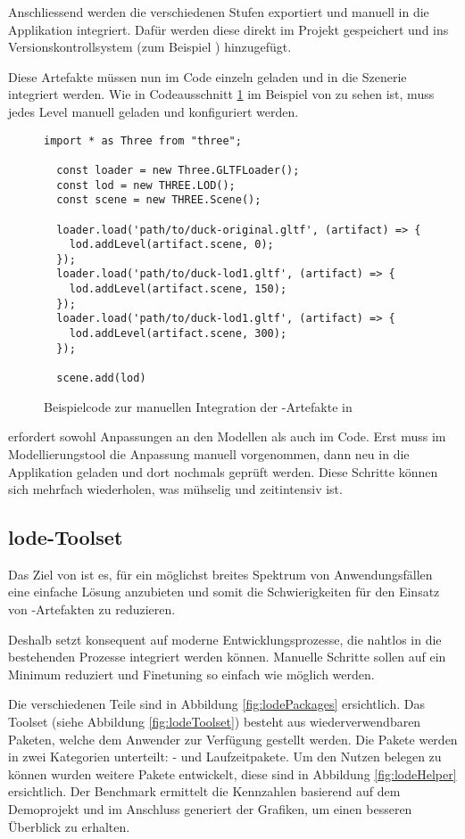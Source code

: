 Anschliessend werden die verschiedenen Stufen exportiert und manuell in die Applikation integriert. Dafür werden diese direkt im Projekt gespeichert und ins Versionskontrollsystem (zum Beispiel ) hinzugefügt.

Diese Artefakte müssen nun im Code einzeln geladen und in die Szenerie integriert werden. Wie in Codeausschnitt \ref{code:threejsManualLodUsage} im Beispiel von  zu sehen ist, muss jedes Level manuell geladen und konfiguriert werden.
\begin{figure}[H]
  \begin{lstlisting}[style=JavaScript]
  import * as Three from "three";

  const loader = new Three.GLTFLoader();
  const lod = new THREE.LOD();
  const scene = new THREE.Scene();

  loader.load('path/to/duck-original.gltf', (artifact) => {
    lod.addLevel(artifact.scene, 0);
  });
  loader.load('path/to/duck-lod1.gltf', (artifact) => {
    lod.addLevel(artifact.scene, 150);
  });
  loader.load('path/to/duck-lod1.gltf', (artifact) => {
    lod.addLevel(artifact.scene, 300);
  });

  scene.add(lod)
  \end{lstlisting}
  \caption{Beispielcode zur manuellen Integration der -Artefakte in }
  \label{code:threejsManualLodUsage}
\end{figure}

 erfordert sowohl Anpassungen an den Modellen als auch im Code. Erst muss im Modellierungstool die Anpassung manuell vorgenommen, dann neu in die Applikation geladen und dort nochmals geprüft werden. Diese Schritte können sich mehrfach wiederholen, was mühselig und zeitintensiv ist.

\subsection{lode-Toolset}

Das Ziel von  ist es, für ein möglichst breites Spektrum von Anwendungsfällen eine einfache Lösung anzubieten und somit die Schwierigkeiten für den Einsatz von -Artefakten zu reduzieren.

Deshalb setzt  konsequent auf moderne Entwicklungsprozesse, die nahtlos in die bestehenden Prozesse integriert werden können. Manuelle Schritte sollen auf ein Minimum reduziert und Finetuning so einfach wie möglich werden.

Die verschiedenen Teile sind in Abbildung \ref{fig:lodePackages} ersichtlich. Das Toolset (siehe Abbildung \ref{fig:lodeToolset}) besteht aus wiederverwendbaren Paketen, welche dem Anwender zur Verfügung gestellt werden. Die Pakete werden in zwei Kategorien unterteilt: - und Laufzeitpakete. Um den Nutzen belegen zu können wurden weitere Pakete entwickelt, diese sind in Abbildung \ref{fig:lodeHelper} ersichtlich. Der Benchmark ermittelt die Kennzahlen basierend auf dem Demoprojekt und im Anschluss generiert der  Grafiken, um einen besseren Überblick zu erhalten.

